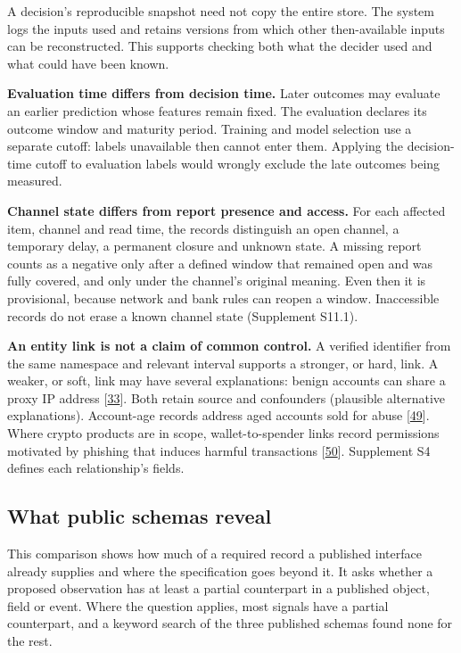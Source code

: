 \documentclass[acmlarge,nonacm]{acmart}
\begin{document}
A decision's reproducible snapshot need not copy the entire store. The
system logs the inputs used and retains versions from which other
then-available inputs can be reconstructed. This supports checking both
what the decider used and what could have been known.

\textbf{Evaluation time differs from decision time.} Later outcomes may
evaluate an earlier prediction whose features remain fixed. The
evaluation declares its outcome window and maturity period. Training and
model selection use a separate cutoff: labels unavailable then cannot
enter them. Applying the decision-time cutoff to evaluation labels would
wrongly exclude the late outcomes being measured.

\textbf{Channel state differs from report presence and access.} For each
affected item, channel and read time, the records distinguish an open
channel, a temporary delay, a permanent closure and unknown state. A
missing report counts as a negative only after a defined window that
remained open and was fully covered, and only under the channel's
original meaning. Even then it is provisional, because network and bank
rules can reopen a window. Inaccessible records do not erase a known
channel state (Supplement S11.1).

\textbf{An entity link is not a claim of common control.} A verified
identifier from the same namespace and relevant interval supports a
stronger, or hard, link. A weaker, or soft, link may have several
explanations: benign accounts can share a proxy IP address
{[}\protect\hyperlink{ref-Liu2018GEM}{33}{]}. Both retain source and
confounders (plausible alternative explanations). Account-age records
address aged accounts sold for abuse
{[}\protect\hyperlink{ref-Thomas2013}{49}{]}. Where crypto products are
in scope, wallet-to-spender links record permissions motivated by
phishing that induces harmful transactions
{[}\protect\hyperlink{ref-Chen2025Phishing}{50}{]}. Supplement S4
defines each relationship's fields.

\hypertarget{what-public-schemas-reveal}{%
\subsection{What public schemas
reveal}\label{what-public-schemas-reveal}}

This comparison shows how much of a required record a published
interface already supplies and where the specification goes beyond it.
It asks whether a proposed observation has at least a partial
counterpart in a published object, field or event. Where the question
applies, most signals have a partial counterpart, and a keyword search
of the three published schemas found none for the rest.
\end{document}
